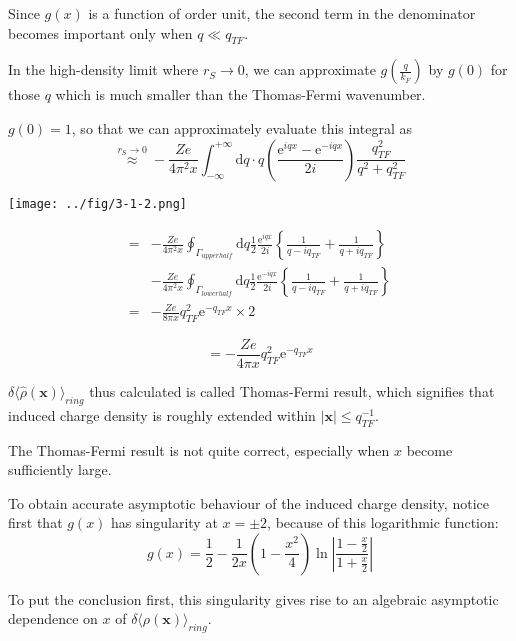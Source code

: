 \begin{itemize}
Since $g(x)$ is a function of order unit, the second term in the denominator becomes important only when $q \ll q_{TF}$.

In the high-density limit where $r_S \rightarrow 0$, we can approximate $g(\frac{q}{k_F})$ by $g(0)$ for those $q$ which is much smaller than the Thomas-Fermi wavenumber.

$g(0)=1$, so that we can approximately evaluate this integral as
\[\overset{r_S \rightarrow 0}{\approx} - \frac{Z e}{4\pi^2 x} \int_{-\infty}^{+\infty}\mathrm{d}q \cdot q\left( \frac{\mathrm{e}^{i qx}-\mathrm{e}^{-i qx}}{2i} \right)\frac{q_{TF}^2}{q^2+q_{TF}^2}\]

\begin{center} \label{Fig3.1.2}
\texttt{[image: ../fig/3-1-2.png]}
\end{center}

\[\begin{split}
=& - \frac{Z e}{4\pi^2 x}\oint_{\Gamma_{upper half}} \mathrm{d}q \frac{1}{2}\frac{\mathrm{e}^{i q x}}{2i}\left\{ \frac{1}{q-i q_{TF}}+\frac{1}{q+i q_{TF}} \right\}\\
&-\frac{Z e}{4\pi^2 x}\oint_{\Gamma_{lower half}} \mathrm{d}q \frac{1}{2}\frac{\mathrm{e}^{-i q x}}{2i}\left\{ \frac{1}{q-i q_{TF}}+\frac{1}{q+i q_{TF}} \right\}\\
=& - \frac{Z e}{8 \pi x}q_{TF}^2 \mathrm{e}^{-q_{TF} x} \times 2
\end{split}\]

\begin{equation} \label{Eqs3.1.29}
=- \frac{Z e}{4 \pi x}q_{TF}^2 \mathrm{e}^{-q_{TF} x}
\end{equation}

$\delta \langle \hat{\rho}(\mathbf{x}) \rangle_{ring}$ thus calculated is called Thomas-Fermi result, which signifies that induced charge density is roughly extended within $|\mathbf{x}| \leq q_{TF}^{-1}$.

The Thomas-Fermi result is not quite correct, especially when $x$ become sufficiently large.

To obtain accurate asymptotic behaviour of the induced charge density, notice first that $g(x)$ has singularity at $x=\pm 2$, because of this logarithmic function:
\[ g(x) = \frac{1}{2} - \frac{1}{2x} \left( 1-\frac{x^2}{4} \right) \ln \left| \frac{1-\frac{x}{2}}{1+\frac{x}{2}} \right| \]

To put the conclusion first, this singularity gives rise to an algebraic asymptotic dependence on $x$ of $\delta\langle \rho(\mathbf{x})\rangle_{ring}$.


\end{itemize}
